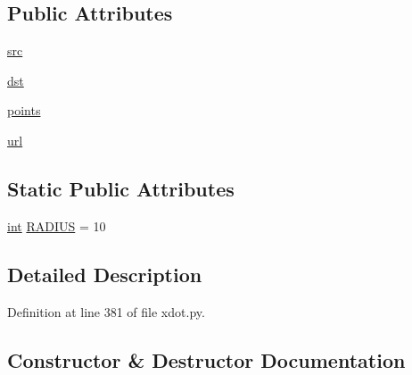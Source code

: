 \subsection*{Public Attributes}
\begin{DoxyCompactItemize}
\item 
\hyperlink{classsmacc__viewer_1_1xdot_1_1xdot_1_1Edge_ae8c708b03328bc06b00d2cc30626e61c}{src}
\item 
\hyperlink{classsmacc__viewer_1_1xdot_1_1xdot_1_1Edge_a06202fe28435076ee948cae331614c6f}{dst}
\item 
\hyperlink{classsmacc__viewer_1_1xdot_1_1xdot_1_1Edge_ad3f042ee88c18f56adff36941ae9be3d}{points}
\item 
\hyperlink{classsmacc__viewer_1_1xdot_1_1xdot_1_1Edge_aa940458bc40062bd2e9857bc02102171}{url}
\end{DoxyCompactItemize}
\subsection*{Static Public Attributes}
\begin{DoxyCompactItemize}
\item 
\hyperlink{classint}{int} \hyperlink{classsmacc__viewer_1_1xdot_1_1xdot_1_1Edge_a13af40bbc8e6a64e08c4d3a76afde6ec}{R\+A\+D\+I\+US} = 10
\end{DoxyCompactItemize}


\subsection{Detailed Description}


Definition at line 381 of file xdot.\+py.



\subsection{Constructor \& Destructor Documentation}
